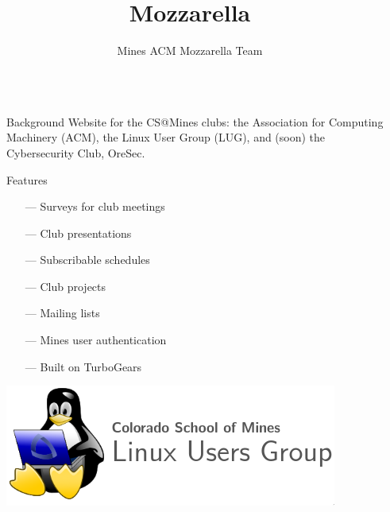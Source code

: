 \documentclass[final]{beamer}
\title{Mozzarella}
\author{Mines ACM Mozzarella Team}
\institute{Department of Computer Science, Colorado School of Mines}
\newlength{\sepwid}
\newlength{\onecolwid}
\begin{document}

    \setlength{\belowcaptionskip}{2ex} %
    \setlength\belowdisplayshortskip{2ex} %

    \begin{frame}[t] %
        \begin{columns}[t]
            \begin{column}{\sepwid}\end{column} %

            \begin{column}{\onecolwid} %

                \begin{block}{Background}
                    Website for the CS@Mines clubs: the Association for
                    Computing Machinery (ACM), the Linux User Group (LUG), and
                    (soon) the Cybersecurity Club, OreSec.
                \end{block}

                \begin{block}{Features}
                    \begin{itemize}[leftmargin=8.75cm, labelsep=1cm]
                        \item[---] Surveys for club meetings
                        \item[---] Club presentations
                        \item[---] Subscribable schedules
                        \item[---] Club projects
                        \item[---] Mailing lists
                        \item[---] Mines user authentication
                        \item[---] Built on TurboGears
                    \end{itemize}
                \end{block}
		\includegraphics[width=.95\linewidth]{lug-logo.png}


\end{column}
\end{columns}
\end{frame}
\end{document}
